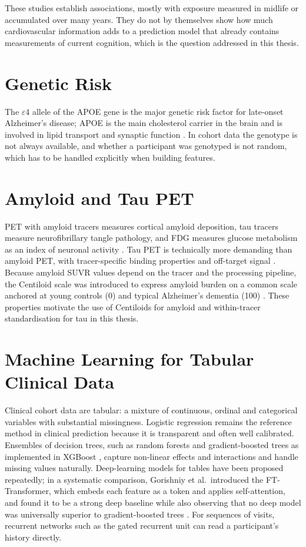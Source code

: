 These studies establish associations, mostly with exposure measured in midlife or accumulated over many years. They do not by themselves show how much cardiovascular information adds to a prediction model that already contains measurements of current cognition, which is the question addressed in this thesis.

\section{Genetic Risk}

The $\varepsilon$4 allele of the APOE gene is the major genetic risk factor for late-onset Alzheimer's disease; APOE is the main cholesterol carrier in the brain and is involved in lipid transport and synaptic function \cite{wolfe2018}. In cohort data the genotype is not always available, and whether a participant was genotyped is not random, which has to be handled explicitly when building features.

\section{Amyloid and Tau PET}

PET with amyloid tracers measures cortical amyloid deposition, tau tracers measure neurofibrillary tangle pathology, and FDG measures glucose metabolism as an index of neuronal activity \cite{chandra2019}. Tau PET is technically more demanding than amyloid PET, with tracer-specific binding properties and off-target signal \cite{leuzy2019}. Because amyloid SUVR values depend on the tracer and the processing pipeline, the Centiloid scale was introduced to express amyloid burden on a common scale anchored at young controls (0) and typical Alzheimer's dementia (100) \cite{klunk2015}. These properties motivate the use of Centiloids for amyloid and within-tracer standardisation for tau in this thesis.

\section{Machine Learning for Tabular Clinical Data}

Clinical cohort data are tabular: a mixture of continuous, ordinal and categorical variables with substantial missingness. Logistic regression remains the reference method in clinical prediction because it is transparent and often well calibrated. Ensembles of decision trees, such as random forests \cite{breiman2001} and gradient-boosted trees as implemented in XGBoost \cite{chen2016}, capture non-linear effects and interactions and handle missing values naturally. Deep-learning models for tables have been proposed repeatedly; in a systematic comparison, Gorishniy et al.\ introduced the FT-Transformer, which embeds each feature as a token and applies self-attention, and found it to be a strong deep baseline while also observing that no deep model was universally superior to gradient-boosted trees \cite{gorishniy2021}. For sequences of visits, recurrent networks such as the gated recurrent unit \cite{cho2014} can read a participant's history directly.

